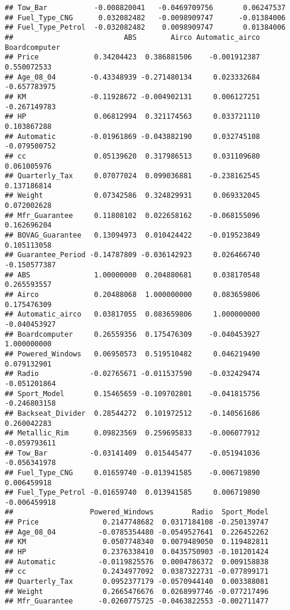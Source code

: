 \documentclass[]{article}
\begin{document}
\begin{verbatim}
## Tow_Bar           -0.008820041   -0.0469709756       0.06247537
## Fuel_Type_CNG      0.032082482   -0.0098909747      -0.01384006
## Fuel_Type_Petrol  -0.032082482    0.0098909747       0.01384006
##                          ABS        Airco Automatic_airco Boardcomputer
## Price             0.34204423  0.386881506    -0.001912387   0.550072533
## Age_08_04        -0.43348939 -0.271480134     0.023332684  -0.657783975
## KM               -0.11928672 -0.004902131     0.006127251  -0.267149783
## HP                0.06812994  0.321174563     0.033721110   0.103867288
## Automatic        -0.01961869 -0.043882190     0.032745108  -0.079500752
## cc                0.05139620  0.317986513     0.031109680   0.061005976
## Quarterly_Tax     0.07077024  0.099036881    -0.238162545   0.137186814
## Weight            0.07342586  0.324829931     0.069332045   0.072002628
## Mfr_Guarantee     0.11808102  0.022658162    -0.068155096   0.162696204
## BOVAG_Guarantee   0.13094973  0.010424422    -0.019523849   0.105113058
## Guarantee_Period -0.14787809 -0.036142923     0.026466740  -0.150577387
## ABS               1.00000000  0.204880681     0.038170548   0.265593557
## Airco             0.20488068  1.000000000     0.083659806   0.175476309
## Automatic_airco   0.03817055  0.083659806     1.000000000  -0.040453927
## Boardcomputer     0.26559356  0.175476309    -0.040453927   1.000000000
## Powered_Windows   0.06950573  0.519510482     0.046219490   0.079132901
## Radio            -0.02765671 -0.011537590    -0.032429474  -0.051201864
## Sport_Model       0.15465659 -0.109702801    -0.041815756  -0.246803158
## Backseat_Divider  0.28544272  0.101972512    -0.140561686   0.260042283
## Metallic_Rim      0.09823569  0.259695833    -0.006077912  -0.059793611
## Tow_Bar          -0.03141409  0.015445477    -0.051941036  -0.056341978
## Fuel_Type_CNG     0.01659740 -0.013941585    -0.006719890   0.006459918
## Fuel_Type_Petrol -0.01659740  0.013941585     0.006719890  -0.006459918
##                  Powered_Windows         Radio  Sport_Model
## Price               0.2147748682  0.0317184108 -0.250139747
## Age_08_04          -0.0785354480 -0.0549527641  0.226452262
## KM                  0.0507748340  0.0079489050  0.119482811
## HP                  0.2376338410  0.0435750903 -0.101201424
## Automatic          -0.0119825576  0.0004786372  0.009158838
## cc                  0.2434977092  0.0387322731 -0.077899171
## Quarterly_Tax       0.0952377179 -0.0570944140  0.003388081
## Weight              0.2665476676  0.0268997746 -0.077217496
## Mfr_Guarantee      -0.0260775725 -0.0463822553 -0.002711477

\end{verbatim}
\end{document}
